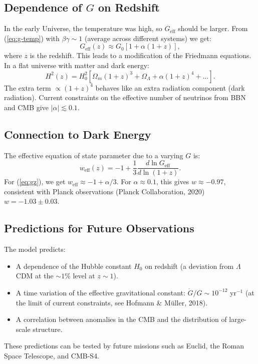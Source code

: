 \documentclass[12pt]{article}
\theoremstyle{remark}
\begin{document}
	\subsection{Dependence of $G$ on Redshift}
	\label{subsec:cosmo-gz}
	
	In the early Universe, the temperature was high, so $G_{\text{eff}}$ should be larger. From (\ref{eq:g-temp}) with $\beta\gamma \sim 1$ (average across different systems) we get:
	\begin{equation}
		G_{\text{eff}}(z) \approx G_0 \left[ 1 + \alpha (1+z) \right],
		\label{eq:gz}
	\end{equation}
	where $z$ is the redshift. This leads to a modification of the Friedmann equations. In a flat universe with matter and dark energy:
	\begin{equation}
		H^2(z) = H_0^2 \left[ \Omega_m (1+z)^3 + \Omega_\Lambda + \alpha (1+z)^4 + \dots \right].
		\label{eq:friedmann}
	\end{equation}
	The extra term $\propto (1+z)^4$ behaves like an extra radiation component (dark radiation). Current constraints on the effective number of neutrinos from BBN and CMB give $|\alpha| \lesssim 0.1$.
	
	\subsection{Connection to Dark Energy}
	\label{subsec:cosmo-de}
	
	The effective equation of state parameter due to a varying $G$ is:
	\begin{equation}
		w_{\text{eff}}(z) = -1 + \frac{1}{3} \frac{d \ln G_{\text{eff}}}{d \ln(1+z)}.
		\label{eq:weff}
	\end{equation}
	For (\ref{eq:gz}), we get $w_{\text{eff}} \approx -1 + \alpha/3$. For $\alpha \approx 0.1$, this gives $w \approx -0.97$, consistent with Planck observations (Planck Collaboration, 2020) $w = -1.03 \pm 0.03$.
	
	\subsection{Predictions for Future Observations}
	\label{subsec:cosmo-predictions}
	
	The model predicts:
	\begin{itemize}
		\item A dependence of the Hubble constant $H_0$ on redshift (a deviation from $\Lambda$CDM at the $\sim 1\%$ level at $z\sim 1$).
		\item A time variation of the effective gravitational constant: $\dot{G}/G \sim 10^{-12}$ yr$^{-1}$ (at the limit of current constraints, see Hofmann \& Müller, 2018).
		\item A correlation between anomalies in the CMB and the distribution of large-scale structure.
	\end{itemize}
	These predictions can be tested by future missions such as Euclid, the Roman Space Telescope, and CMB-S4.
	
\end{document}
